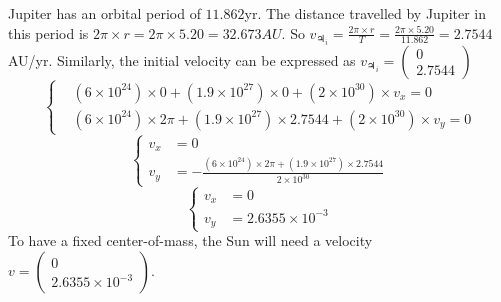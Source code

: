 \documentclass[a4paper, twoside, 11pt]{report}
\theoremstyle{theorem}
\theoremstyle{remark}
\theoremstyle{exemple}
\begin{document}
            Jupiter has an orbital period of $11.862$yr. The distance travelled by Jupiter in this period is $2 \pi \times r = 2 \pi \times 5.20 = 32.673 AU$. So $v_{\jupiter_i}= \frac{2 \pi \times r}{T} = \frac{2 \pi \times 5.20}{11.862} = 2.7544 $ AU/yr. Similarly, the initial velocity can be expressed as $v_{\jupiter_i} = \left(\begin{array}{c}
                0 \\
                2.7544
                \end{array} \right)$ 
                \begin{equation*}
                    \left\{
                        \begin{aligned}
                            &(6\times 10^{24}) \times 0 + (1.9 \times 10^{27}) \times 0 + (2 \times 10^{30}) \times v_x = 0 \\
                            &(6\times 10^{24}) \times 2 \pi + (1.9 \times 10^{27}) \times 2.7544 + (2 \times 10^{30}) \times v_y = 0
                        \end{aligned}
                    \right.
                \end{equation*}
                \begin{equation*}
                    \left\{
                        \begin{aligned}
                            v_x &= 0\\
                            v_y &= - \frac{(6\times 10^{24}) \times 2 \pi + (1.9 \times 10^{27}) \times 2.7544}{2 \times 10^{30}}
                        \end{aligned}
                    \right.
                \end{equation*}
                \begin{equation*}
                    \left\{
                        \begin{aligned}
                            v_x &= 0\\
                            v_y &= 2.6355 \times 10^{-3}
                        \end{aligned}
                    \right.
                    \tag{6}
                \end{equation*}
            To have a fixed center-of-mass, the Sun will need a velocity $v =
            \left(\begin{array}{c}
                0\\
               2.6355 \times 10^{-3}
            \end{array} \right)$.                
    
\end{document}
